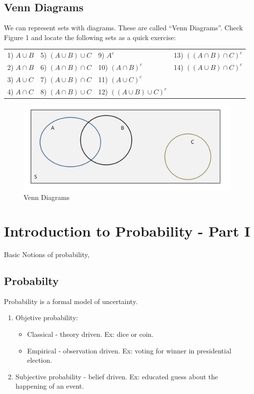 \documentclass[11pt]{article}
\begin{document}
\subsection{Venn Diagrams}
 We can represent sets with diagrams. These are called ``Venn Diagrams''. Check Figure 1 and locate the following sets as a quick exercise:\\


\begin{tabular}{llll}
	1) $A \cup B$ & 5) $(A \cup B) \cup C$ & 9) $A^c$ & 13) $((A \cap B) \cap C)^c$\\
	2) $A \cap B$ & 6) $(A \cap B) \cap C$ & 10) $(A \cap B)^c$ & 14) $((A \cup B) \cap C)^c$\\
	3) $A \cup C$ & 7) $(A \cup B) \cap C$ & 11) $(A \cup C)^c$ &\\
	4) $A \cap C$ & 8) $(A \cap B) \cup C$ & 12) $((A \cup B) \cup C)^c$ &\\
\end{tabular}

\begin{figure}[htp]
\centering
\includegraphics[scale=0.50]{venn.png}
\caption{Venn Diagrams}
\label{}
\end{figure}


\pagebreak

\section{Introduction to Probability - Part I}

	Basic Notions of probability,
	
	\subsection{Probabilty}
	Probability is a formal model of uncertainty.

	\begin{enumerate}
	\item Objetive probability:
		\begin{itemize}
			\item Classical - theory driven. Ex: dice or coin.
			\item Empirical - observation driven. Ex: voting for winner in presidential election.
		\end{itemize}
	\item Subjective probability - belief driven. Ex: educated guess about the happening of an event.
	\end{enumerate}
\end{document}
